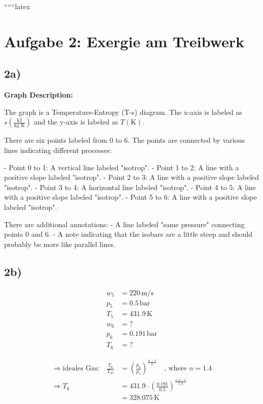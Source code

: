 
``````latex


\section*{Aufgabe 2: Exergie am Treibwerk}

\subsection*{2a)}

\begin{center}
\textbf{Graph Description:}
\end{center}

The graph is a Temperature-Entropy (T-s) diagram. The x-axis is labeled as \( s \left( \frac{\text{kJ}}{\text{kg K}} \right) \) and the y-axis is labeled as \( T \left( \text{K} \right) \). 

There are six points labeled from 0 to 6. The points are connected by various lines indicating different processes:

- Point 0 to 1: A vertical line labeled "isotrop".
- Point 1 to 2: A line with a positive slope labeled "isotrop".
- Point 2 to 3: A line with a positive slope labeled "isotrop".
- Point 3 to 4: A horizontal line labeled "isotrop".
- Point 4 to 5: A line with a positive slope labeled "isotrop".
- Point 5 to 6: A line with a positive slope labeled "isotrop".

There are additional annotations:
- A line labeled "same pressure" connecting points 0 and 6.
- A note indicating that the isobars are a little steep and should probably be more like parallel lines.

\subsection*{2b)}

\begin{align*}
w_5 &= 220 \, \text{m/s} \\
p_5 &= 0.5 \, \text{bar} \\
T_5 &= 431.9 \, \text{K} \\
w_6 &= ? \\
p_6 &= 0.191 \, \text{bar} \\
T_6 &= ? 
\end{align*}

 \Rightarrow {}

\begin{align*}
\Rightarrow \text{ideales Gas:} \quad \frac{T_6}{T_45} &= \left( \frac{p_6}{p_5} \right)^{\frac{n-1}{n}} \quad \text{, where } n = 1.4 \\
\Rightarrow T_6 &= 431.9 \cdot \left( \frac{0.191}{0.5} \right)^{\frac{1.4-1}{1.4}} \\
&= 328.075 \, \text{K}
\end{align*}

